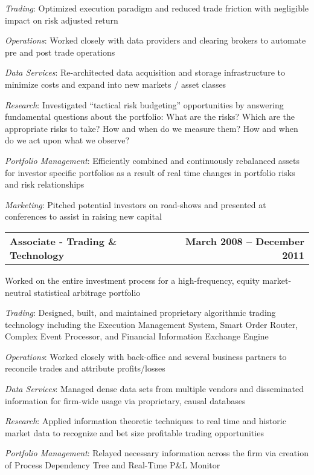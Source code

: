 \documentclass[10.75pt]{article}
\begin{document}
    \begin{list}{}{\leftmargin=1em}
      \item \textit{Trading}: Optimized execution paradigm and reduced trade
        friction with negligible impact on risk adjusted return
      \item \textit{Operations}: Worked closely with data providers and clearing
        brokers to automate pre and post trade operations
      \item \textit{Data Services}: Re-architected data acquisition and storage
        infrastructure to minimize costs and expand into new markets / asset classes
      \item \textit{Research}: Investigated ``tactical risk budgeting'' opportunities
        by answering fundamental questions about the portfolio: What are the risks?
        Which are the appropriate risks to take? How and when do we measure them?
        How and when do we act upon what we observe?
      \item \textit{Portfolio Management}: Efficiently combined and continuously
        rebalanced assets for investor specific portfolios as a result of real
        time changes in portfolio risks and risk relationships
      \item \textit{Marketing}: Pitched potential investors on road-shows and
        presented at conferences to assist in raising new capital
    \end{list}
  \begin{tabular*}{7.5in}{@{\extracolsep{\fill}}lr}
    \textbf{Associate - Trading \& Technology} & \textbf{March 2008 -- December 2011}
  \end{tabular*}
    \begin{list}{}{\leftmargin=0em}
      \item Worked on the entire investment process for a high-frequency,
        equity market-neutral statistical arbitrage portfolio
    \end{list}
    \begin{list}{}{\leftmargin=1em}
      \item \textit{Trading}: Designed, built, and maintained proprietary algorithmic
        trading technology including the Execution Management System, Smart Order
        Router, Complex Event Processor, and Financial Information Exchange Engine
      \item \textit{Operations}: Worked closely with back-office and several
        business partners to reconcile trades and attribute profits/losses
      \item \textit{Data Services}: Managed dense data sets from multiple vendors
        and disseminated information for firm-wide usage via proprietary, causal databases
      \item \textit{Research}: Applied information theoretic techniques to real
        time and historic market data to recognize and bet size profitable trading
        opportunities
      \item \textit{Portfolio Management}: Relayed necessary information across
        the firm via creation of Process Dependency Tree and Real-Time P\&L Monitor
    \end{list}
\end{document}
